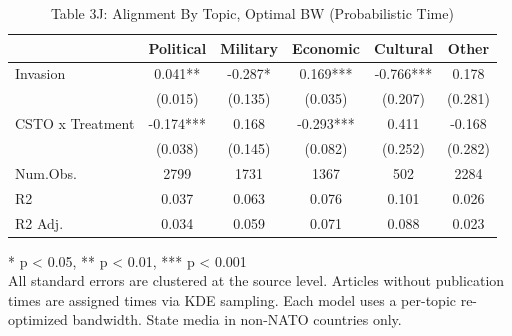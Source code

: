 \begin{table}[!t]
\caption{Table 3J: Alignment By Topic, Optimal BW (Probabilistic Time)} 
\fontsize{12.0pt}{14.4pt}\selectfont
\begin{tabular*}{\linewidth}{@{\extracolsep{\fill}}lccccc}
\toprule
  & Political & Military & Economic & Cultural & Other \\ 
\midrule\addlinespace[2.5pt]
Invasion & 0.041** & -0.287* & 0.169*** & -0.766*** & 0.178 \\ 
 & (0.015) & (0.135) & (0.035) & (0.207) & (0.281) \\ 
CSTO x Treatment & -0.174*** & 0.168 & -0.293*** & 0.411 & -0.168 \\ 
{} & {(0.038)} & {(0.145)} & {(0.082)} & {(0.252)} & {(0.282)} \\ 
Num.Obs. & 2799 & 1731 & 1367 & 502 & 2284 \\ 
R2 & 0.037 & 0.063 & 0.076 & 0.101 & 0.026 \\ 
R2 Adj. & 0.034 & 0.059 & 0.071 & 0.088 & 0.023 \\ 
\bottomrule
\end{tabular*}
\begin{minipage}{\linewidth}
* p < 0.05, ** p < 0.01, *** p < 0.001\\
All standard errors are clustered at the source level. Articles without
publication times are assigned times via KDE sampling. Each model uses a
per-topic re-optimized bandwidth. State media in non-NATO countries only.\\
\end{minipage}
\end{table}

